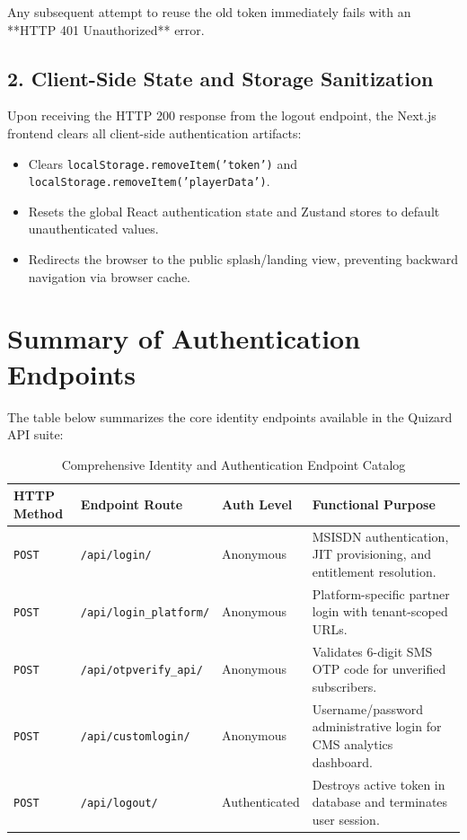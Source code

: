 Any subsequent attempt to reuse the old token immediately fails with an **HTTP 401 Unauthorized** error.

\subsection{2. Client-Side State and Storage Sanitization}
Upon receiving the HTTP 200 response from the logout endpoint, the Next.js frontend clears all client-side authentication artifacts:
\begin{itemize}
    \item Clears \texttt{localStorage.removeItem('token')} and \texttt{localStorage.removeItem('playerData')}.
    \item Resets the global React authentication state and Zustand stores to default unauthenticated values.
    \item Redirects the browser to the public splash/landing view, preventing backward navigation via browser cache.
\end{itemize}

\section{Summary of Authentication Endpoints}
The table below summarizes the core identity endpoints available in the Quizard API suite:

\begin{table}[htbp]
\centering
\footnotesize
\begin{tabular}{|l|l|l|p{5.5cm}|}
\hline
\rowcolor{primaryBlue!15}
\textbf{HTTP Method} & \textbf{Endpoint Route} & \textbf{Auth Level} & \textbf{Functional Purpose} \\ \hline
\texttt{POST} & \texttt{/api/login/} & Anonymous & MSISDN authentication, JIT provisioning, and entitlement resolution. \\ \hline
\texttt{POST} & \texttt{/api/login\_platform/} & Anonymous & Platform-specific partner login with tenant-scoped URLs. \\ \hline
\texttt{POST} & \texttt{/api/otpverify\_api/} & Anonymous & Validates 6-digit SMS OTP code for unverified subscribers. \\ \hline
\texttt{POST} & \texttt{/api/customlogin/} & Anonymous & Username/password administrative login for CMS analytics dashboard. \\ \hline
\texttt{POST} & \texttt{/api/logout/} & Authenticated & Destroys active token in database and terminates user session. \\ \hline
\end{tabular}
\caption{Comprehensive Identity and Authentication Endpoint Catalog}
\end{table}

